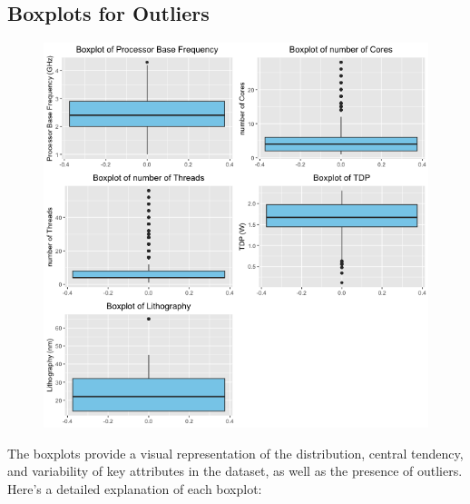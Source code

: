 \subsection{Boxplots for Outliers}
\begin{figure}[H]
    \begin{center}
    \includegraphics[width=14cm]{graphics/boxplot.png}
    \end{center}
\end{figure}
The boxplots provide a visual representation of the distribution, central tendency, and variability of key attributes in the dataset, as well as the presence of outliers. Here's a detailed explanation of each boxplot:

